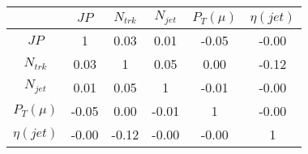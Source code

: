 \begin{tabular}{|c|c|c|c|c|c|} 
\hline
 & $JP$ & $N_{trk}$ & $N_{jet}$ & $P_{T} (\mu)$ & $\eta (jet)$ \\ \hline
$JP$ & 1 & 0.03 & 0.01 & -0.05 & -0.00 \\
$N_{trk}$ & 0.03 & 1 & 0.05 & 0.00 & -0.12 \\
$N_{jet}$ & 0.01 & 0.05 & 1 & -0.01 & -0.00 \\
$P_{T} (\mu)$ & -0.05 & 0.00 & -0.01 & 1 & -0.00 \\
$\eta (jet)$ & -0.00 & -0.12 & -0.00 & -0.00 & 1 \\
\hline 
\end{tabular} 


